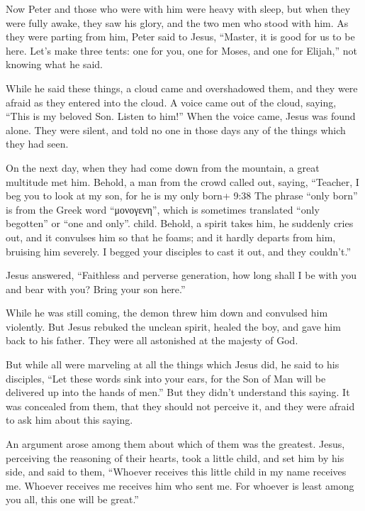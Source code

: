  Now Peter and those who were with him were heavy with
sleep, but when they were fully awake, they saw his glory, and the two
men who stood with him.  As they were parting from him,
Peter said to Jesus, ``Master, it is good for us to be here. Let's make
three tents: one for you, one for Moses, and one for Elijah,'' not
knowing what he said.

 While he said these things, a cloud came and overshadowed
them, and they were afraid as they entered into the cloud. 
A voice came out of the cloud, saying, ``This is my beloved Son. Listen
to him!''  When the voice came, Jesus was found alone. They
were silent, and told no one in those days any of the things which they
had seen.

 On the next day, when they had come down from the
mountain, a great multitude met him.  Behold, a man from
the crowd called out, saying, ``Teacher, I beg you to look at my son,
for he is my only born+ 9:38 The phrase ``only born'' is from the Greek
word ``μονογενη'', which is sometimes translated ``only begotten'' or
``one and only''. child.  Behold, a spirit takes him, he
suddenly cries out, and it convulses him so that he foams; and it hardly
departs from him, bruising him severely.  I begged your
disciples to cast it out, and they couldn't.''

 Jesus answered, ``Faithless and perverse generation, how
long shall I be with you and bear with you? Bring your son here.''

 While he was still coming, the demon threw him down and
convulsed him violently. But Jesus rebuked the unclean spirit, healed
the boy, and gave him back to his father.  They were all
astonished at the majesty of God.

But while all were marveling at all the things which Jesus did, he said
to his disciples,  ``Let these words sink into your ears,
for the Son of Man will be delivered up into the hands of men.''
 But they didn't understand this saying. It was concealed
from them, that they should not perceive it, and they were afraid to ask
him about this saying.

 An argument arose among them about which of them was the
greatest.  Jesus, perceiving the reasoning of their hearts,
took a little child, and set him by his side,  and said to
them, ``Whoever receives this little child in my name receives me.
Whoever receives me receives him who sent me. For whoever is least among
you all, this one will be great.''

